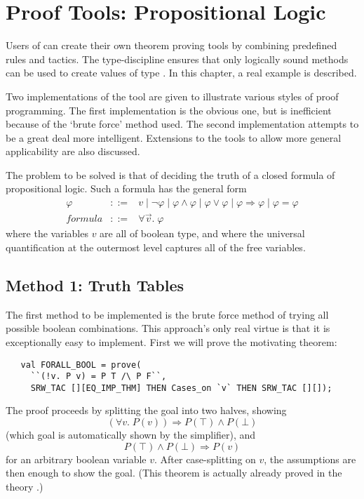 \chapter{Proof Tools: Propositional Logic}
\label{chap:proof-tools}

\newcommand{\naive}{na\"\i{}ve}

Users of \HOL{} can create their own theorem proving tools by
combining predefined rules and tactics. The \ML{} type-discipline
ensures that only logically sound methods can be used to create values
of type .  In this chapter, a real example is described.

Two implementations of the tool are given to illustrate various styles
of proof programming. The first implementation is the obvious one, but
is inefficient because of the `brute force' method used. The second
implementation attempts to be a great deal more intelligent.
Extensions to the tools to allow more general applicability are also
discussed.

The problem to be solved is that of deciding the truth of a closed
formula of propositional logic.  Such a formula has the general form
\[
\begin{array}{ccl}
\varphi & ::= & v \;|\;\neg\varphi\;|\;\varphi
\land \varphi \;|\; \varphi \lor \varphi \;|\; \varphi \Rightarrow
\varphi\;|\;\varphi = \varphi
\\[1ex]
\mathit{formula} &::= & \forall \vec{v}. \;\varphi
\end{array}
\]
where the variables $v$ are all of boolean type, and where the
universal quantification at the outermost level captures all of the
free variables.

\section{Method 1: Truth Tables}

\setcounter{sessioncount}{0}

The first method to be implemented is the brute force method of trying
all possible boolean combinations.  This approach's only real virtue
is that it is exceptionally easy to implement.  First we will prove
the motivating theorem:
\begin{hol}
\begin{verbatim}
   val FORALL_BOOL = prove(
     ``(!v. P v) = P T /\ P F``,
     SRW_TAC [][EQ_IMP_THM] THEN Cases_on `v` THEN SRW_TAC [][]);
\end{verbatim}
\end{hol}
The proof proceeds by splitting the goal into two halves, showing
\[
(\forall v. \;P(v))\Rightarrow P(\top) \land P(\bot)
\]
(which goal is automatically shown by the simplifier), and
\[
P(\top) \land P(\bot) \Rightarrow P(v)
\]
for an arbitrary boolean variable $v$.  After case-splitting on $v$,
the assumptions are then enough to show the goal.  (This theorem is
actually already proved in the theory .)

